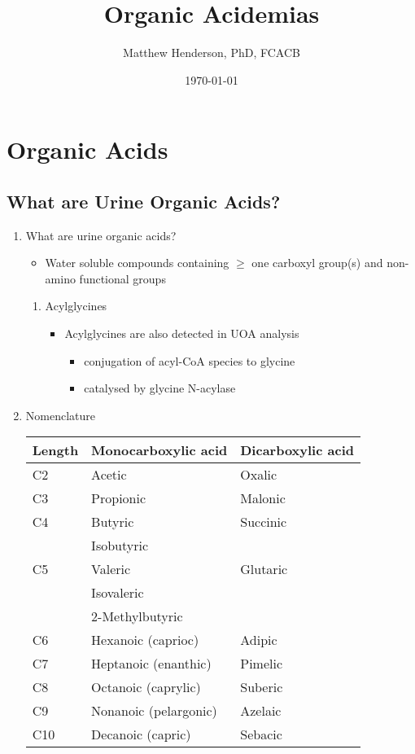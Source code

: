 \documentclass{scrartcl}
\author{Matthew Henderson, PhD, FCACB}
\date{\today}
\title{Organic Acidemias}
\begin{document}
\maketitle
\tableofcontents


\section{Organic Acids}
\label{sec:orgfb9146d}
\subsection{What are Urine Organic Acids?}
\label{sec:orgcd3a925}
\begin{enumerate}
\item What are urine organic acids?
\label{sec:org4182190}
\begin{itemize}
\item Water soluble compounds containing \(\ge\) one carboxyl group(s) and
non-amino functional groups
\end{itemize}


\centering
{}


\begin{enumerate}
\item Acylglycines
\label{sec:orgd409fbb}
\begin{itemize}
\item Acylglycines are also detected in UOA analysis
\begin{itemize}
\item conjugation of acyl-CoA species to glycine
\item catalysed by glycine N-acylase
\end{itemize}
\end{itemize}
\end{enumerate}

\item Nomenclature
\label{sec:org4e9a557}

\begin{center}
\begin{tabular}{lll}
Length & Monocarboxylic acid & Dicarboxylic acid\\
\hline
C2 & Acetic & Oxalic\\
C3 & Propionic & Malonic\\
C4 & Butyric & Succinic\\
 & Isobutyric & \\
C5 & Valeric & Glutaric\\
 & Isovaleric & \\
 & 2-Methylbutyric & \\
C6 & Hexanoic (caprioc) & Adipic\\
C7 & Heptanoic (enanthic) & Pimelic\\
C8 & Octanoic (caprylic) & Suberic\\
C9 & Nonanoic (pelargonic) & Azelaic\\
C10 & Decanoic (capric) & Sebacic\\
\end{tabular}
\end{center}


\end{enumerate}
\end{document}
